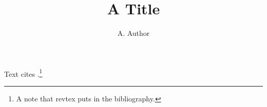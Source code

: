 \documentclass[aps,prl,twocolumn]{revtex4-2}
\begin{document}
\title{A Title}
\author{A. Author}
\maketitle
Text cites \cite{epr}.\footnote{A note that revtex puts in the bibliography.}

\end{document}
